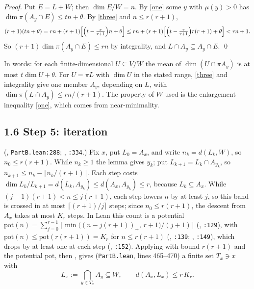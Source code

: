 \documentclass[11pt]{amsart}
\begin{document}
\emph{Proof.} Put $E=L+W$; then $\dim E/W=n$. By \eqref{one} some $y$ with $\mu(y)>0$ has
$\dim\pi(A_y\cap E)\le tn+\theta$. By \eqref{three} and $n\le r(r+1)$,
\[(r+1)(tn+\theta)=rn+(r+1)\Bigl[\Bigl(t-\tfrac r{r+1}\Bigr)n+\theta\Bigr]
\le rn+(r+1)\Bigl[\Bigl(t-\tfrac r{r+1}\Bigr)r(r+1)+\theta\Bigr]<rn+1 .\]
So $(r+1)\dim\pi(A_y\cap E)\le rn$ by integrality, and $L\cap A_y\subseteq A_y\cap E$. \qed

In words: for each finite-dimensional $U\subseteq V/W$ the mean of $\dim(U\cap\pi A_y)$ is at most $t\dim U+\theta$. For
$U=\pi L$ with $\dim U$ in the stated range, \eqref{three} and integrality give one member $A_y$, depending on $L$, with
$\dim\pi(L\cap A_y)\le rn/(r+1)$. The property of $W$ used is the enlargement inequality \eqref{one}, which comes from
near-minimality.

\subsection*{1.6 Step 5: iteration}
(, \texttt{PartB.lean:288}; , \texttt{:334}.) Fix $x$, put $L_0=A_x$,
and write $n_k=d(L_k,W)$, so $n_0\le r(r+1)$. While $n_k\ge1$ the lemma gives $y_k$; put $L_{k+1}=L_k\cap A_{y_k}$, so
$n_{k+1}\le n_k-\lceil n_k/(r+1)\rceil$. Each step costs $\dim L_k/L_{k+1}=d(L_k,A_{y_k})\le d(A_x,A_{y_k})\le r$,
because $L_k\subseteq A_x$. While $(j-1)(r+1)<n\le j(r+1)$, each step lowers $n$ by at least $j$, so this band is crossed
in at most $\lceil (r+1)/j\rceil$ steps; since $n_0\le r(r+1)$, the descent from $A_x$ takes at most $K_r$ steps. In Lean
this count is a potential
$\mathrm{pot}(n)=\sum_{j=0}^{r-1}\bigl\lceil\min\bigl((n-j(r+1))_+,\,r+1\bigr)/(j+1)\bigr\rceil$ (,
\texttt{:129}), with $\mathrm{pot}(n)\le\mathrm{pot}(r(r+1))=K_r$ for $n\le r(r+1)$ (, \texttt{:139};
, \texttt{:149}), which drops by at least one at each step (, \texttt{:152}). Applying
 with bound $r(r+1)$ and the potential $\mathrm{pot}$, then , gives
(\texttt{PartB.lean}, lines 465--470) a finite set $T_x\ni x$ with
\[L_x:=\bigcap_{y\in T_x}A_y\subseteq W,\qquad d(A_x,L_x)\le r\,K_r .\]
\end{document}
